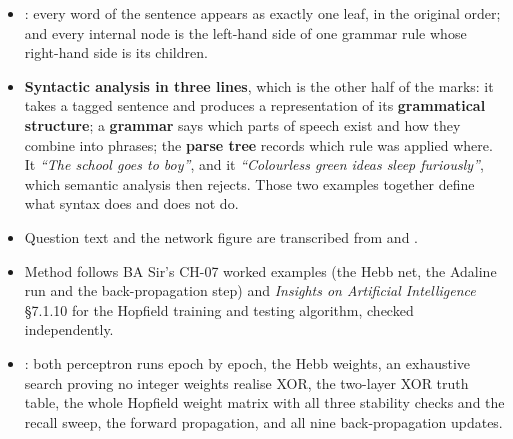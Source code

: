 {
\begin{itemize}
  \item {}: every word of the sentence appears as exactly
        one leaf, in the original order; and every internal node is the left-hand side of
        one grammar rule whose right-hand side is its children.
  \item \textbf{Syntactic analysis in three lines}, which is the other half of the marks:
        it takes a tagged sentence and produces a representation of its
        \textbf{grammatical structure}; a \textbf{grammar} says which parts of speech
        exist and how they combine into phrases; the \textbf{parse tree} records which
        rule was applied where. It  \emph{``The school goes
        to boy''}, and it  \emph{``Colourless green ideas
        sleep furiously''}, which semantic analysis then rejects. Those two examples
        together define what syntax does and does not do.
\end{itemize}}

\hr

\begin{itemize}
  \item Question text and the network figure are transcribed from
         and
        .
  \item Method follows BA Sir's CH-07 worked examples (the Hebb net, the Adaline run and
        the back-propagation step) and \emph{Insights on Artificial Intelligence}
        \S7.1.10 for the Hopfield training and testing algorithm, checked independently.
  \item {}: both perceptron runs epoch by epoch, the Hebb weights,
        an exhaustive search proving no integer weights realise XOR, the two-layer XOR
        truth table, the whole Hopfield weight matrix with all three stability checks and
        the recall sweep, the forward propagation, and all nine back-propagation updates.
\end{itemize}
